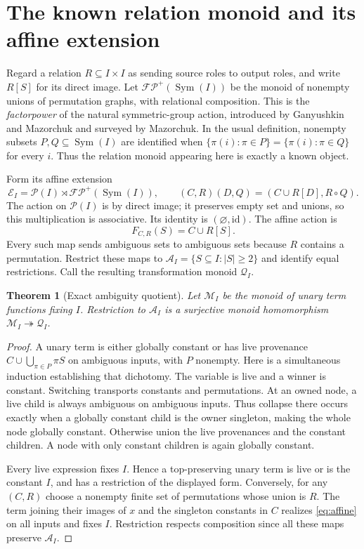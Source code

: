 \documentclass[11pt]{article}
\newtheorem{theorem}{Theorem}[section]
\newcommand{\Sym}{\operatorname{Sym}}
\newcommand{\FP}{\mathcal{FP}^{+}}
\begin{document}
\section{The known relation monoid and its affine extension}

Regard a relation $R\subseteq I\times I$ as sending source roles to
output roles, and write $R[S]$ for its direct image. Let $\FP(\Sym(I))$
be the monoid of nonempty unions of permutation graphs, with relational
composition. This is the \emph{factorpower} of the natural symmetric-group
action, introduced by Ganyushkin and Mazorchuk and surveyed by
Mazorchuk\cite{GanyushkinMazorchuk1995,Mazorchuk2009}. In the usual
definition, nonempty subsets $P,Q\subseteq\Sym(I)$ are identified when
$\{\pi(i):\pi\in P\}=\{\pi(i):\pi\in Q\}$ for every $i$.
Thus the relation monoid appearing here is exactly a known object.

Form its affine extension
\[
 \mathcal E_I=\mathcal P(I)\rtimes\FP(\Sym(I)),\qquad
 (C,R)(D,Q)=(C\cup R[D],R\circ Q).
\]
The action on $\mathcal P(I)$ is by direct image; it preserves empty set
and unions, so this multiplication is associative. Its identity is
$(\varnothing,\mathrm{id})$. The affine action is
\begin{equation}\label{eq:affine}
 F_{C,R}(S)=C\cup R[S].
\end{equation}
Every such map sends ambiguous sets to ambiguous sets because $R$
contains a permutation. Restrict these maps to
$\mathcal A_I=\{S\subseteq I:|S|\geq2\}$ and identify equal restrictions.
Call the resulting transformation monoid $\mathcal Q_I$.

\begin{theorem}[Exact ambiguity quotient]\label{thm:quotient}
Let $\mathcal M_I$ be the monoid of unary term functions fixing $I$.
Restriction to $\mathcal A_I$ is a surjective monoid homomorphism
$\mathcal M_I\twoheadrightarrow\mathcal Q_I$.
\end{theorem}
\begin{proof}
A unary term is either globally constant or has live provenance
$C\cup\bigcup_{\pi\in P}\pi S$ on ambiguous inputs, with $P$ nonempty.
Here is a simultaneous induction establishing that dichotomy. The
variable is live and a winner is constant. Switching transports constants
and permutations. At an owned node, a live child is always ambiguous on
ambiguous inputs. Thus collapse there occurs exactly when a globally
constant child is the owner singleton, making the whole node globally
constant. Otherwise union the live provenances and the constant children.
A node with only constant children is again globally constant.

Every live expression fixes $I$. Hence a top-preserving unary term is
live or is the constant $I$, and has a restriction of the displayed form.
Conversely, for any $(C,R)$ choose a nonempty finite set of permutations
whose union is $R$. The term joining their images of $x$ and the
singleton constants in $C$ realizes \eqref{eq:affine} on all inputs and
fixes $I$. Restriction respects composition since all these maps preserve
$\mathcal A_I$.
\end{proof}
\end{document}
